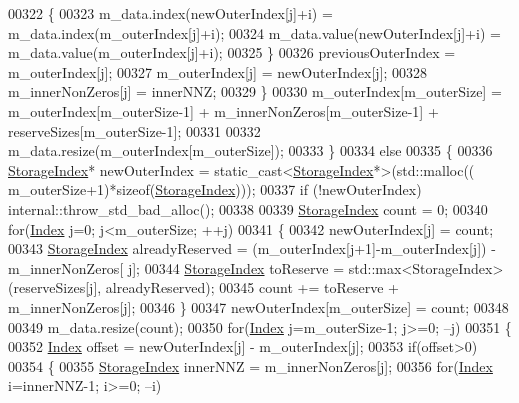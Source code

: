 \begin{DoxyCode}
00322           \{
00323             m\_data.index(newOuterIndex[j]+i) = m\_data.index(m\_outerIndex[j]+i);
00324             m\_data.value(newOuterIndex[j]+i) = m\_data.value(m\_outerIndex[j]+i);
00325           \}
00326           previousOuterIndex = m\_outerIndex[j];
00327           m\_outerIndex[j] = newOuterIndex[j];
00328           m\_innerNonZeros[j] = innerNNZ;
00329         \}
00330         m\_outerIndex[m\_outerSize] = m\_outerIndex[m\_outerSize-1] + m\_innerNonZeros[m\_outerSize-1] + 
      reserveSizes[m\_outerSize-1];
00331         
00332         m\_data.resize(m\_outerIndex[m\_outerSize]);
00333       \}
00334       \textcolor{keywordflow}{else}
00335       \{
00336         \hyperlink{group___sparse_core___module_a0b540ba724726ebe953f8c0df06081ed}{StorageIndex}* newOuterIndex = \textcolor{keyword}{static\_cast<}\hyperlink{group___sparse_core___module_a0b540ba724726ebe953f8c0df06081ed}{StorageIndex}*\textcolor{keyword}{>}(std::malloc((
      m\_outerSize+1)*\textcolor{keyword}{sizeof}(\hyperlink{group___sparse_core___module_a0b540ba724726ebe953f8c0df06081ed}{StorageIndex})));
00337         \textcolor{keywordflow}{if} (!newOuterIndex) internal::throw\_std\_bad\_alloc();
00338         
00339         \hyperlink{group___sparse_core___module_a0b540ba724726ebe953f8c0df06081ed}{StorageIndex} count = 0;
00340         \textcolor{keywordflow}{for}(\hyperlink{group___core___module_a554f30542cc2316add4b1ea0a492ff02}{Index} j=0; j<m\_outerSize; ++j)
00341         \{
00342           newOuterIndex[j] = count;
00343           \hyperlink{group___sparse_core___module_a0b540ba724726ebe953f8c0df06081ed}{StorageIndex} alreadyReserved = (m\_outerIndex[j+1]-m\_outerIndex[j]) - m\_innerNonZeros[
      j];
00344           \hyperlink{group___sparse_core___module_a0b540ba724726ebe953f8c0df06081ed}{StorageIndex} toReserve = std::max<StorageIndex>(reserveSizes[j], alreadyReserved);
00345           count += toReserve + m\_innerNonZeros[j];
00346         \}
00347         newOuterIndex[m\_outerSize] = count;
00348         
00349         m\_data.resize(count);
00350         \textcolor{keywordflow}{for}(\hyperlink{group___core___module_a554f30542cc2316add4b1ea0a492ff02}{Index} j=m\_outerSize-1; j>=0; --j)
00351         \{
00352           \hyperlink{group___core___module_a554f30542cc2316add4b1ea0a492ff02}{Index} offset = newOuterIndex[j] - m\_outerIndex[j];
00353           \textcolor{keywordflow}{if}(offset>0)
00354           \{
00355             \hyperlink{group___sparse_core___module_a0b540ba724726ebe953f8c0df06081ed}{StorageIndex} innerNNZ = m\_innerNonZeros[j];
00356             \textcolor{keywordflow}{for}(\hyperlink{group___core___module_a554f30542cc2316add4b1ea0a492ff02}{Index} i=innerNNZ-1; i>=0; --i)

\end{DoxyCode}
